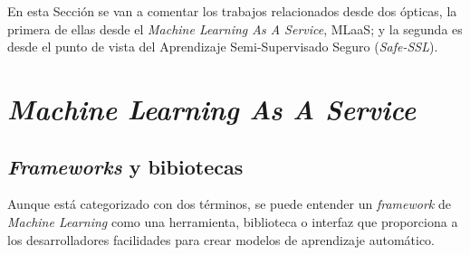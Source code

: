 
En esta Sección se van a comentar los trabajos relacionados desde dos ópticas, la primera de ellas desde el \textit{Machine Learning As A Service}, MLaaS; y la segunda es desde el punto de vista del Aprendizaje Semi-Supervisado Seguro (\textit{Safe-SSL}).

\section{\textit{Machine Learning As A Service}}
\subsection{\textit{Frameworks} y bibiotecas}\label{related:frameworks}
Aunque está categorizado con dos términos, se puede entender un \textit{framework} de \textit{Machine Learning} como una herramienta, biblioteca o interfaz que proporciona a los desarrolladores facilidades para crear modelos de aprendizaje automático.

